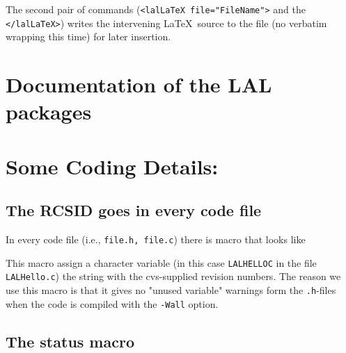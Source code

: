 \documentclass[oneside]{book}
\begin{document}
The second pair of commands (\texttt{<lalLaTeX file="FileName">} and the
\texttt{</lalLaTeX>}) writes the intervening \LaTeX\ source to the file (no
verbatim wrapping this time) for later insertion.

\part{Documentation of the LAL packages}




%
%

%
%
%
%
%
%
%
%

\part{Some Coding Details:}
\chapter{The RCSID goes in every code file}
In every code file (i.e., \texttt{file.h, file.c}) there is macro that looks
like

This macro assign a character variable (in this case \texttt{LALHELLOC} in the
file \texttt{LALHello.c}) the string with the cvs-supplied revision numbers.
The reason we use this macro is that it gives no "unused variable" warnings
form the \texttt{.h}-files when the code is compiled with the \texttt{-Wall}
option.

\chapter{The status macro}

\printindex
\end{document}
